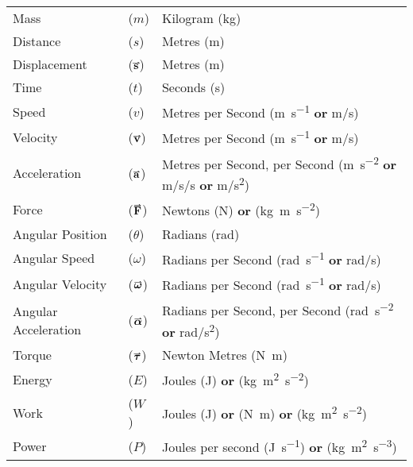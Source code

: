 \documentclass[main.tex]{subfiles}
\begin{document}
            \begin{table}[!h]
                \noindent\begin{tabular}{@{} p{40mm} C{10mm} p{110mm}}
                    Mass &($m$) &Kilogram (\si{\kilo\gram})\\[\tablegap]
                    Distance &($s$) &Metres (\si{\metre})\\[\tablegap]
                    Displacement &($\vect{s}$) &Metres (\si{\metre})\\[\tablegap]
                    Time &($t$) &Seconds (\si{\second})\\[\tablegap]
                    Speed &($v$) &Metres per Second (\si{\metre \per\second} \textbf{or} \si{\metre / \second})\\[\tablegap]
                    Velocity &($\vect{v}$) &Metres per Second (\si{\metre \per\second} \textbf{or} \si{\metre / \second})\\[\tablegap]
                    Acceleration &($\vect{a}$) &Metres per Second, per Second (\si{\metre \per\second\squared} \textbf{or} \si{\metre /\second /\second} \textbf{or} \si{\metre / \second\squared})\\[\tablegap]
                    Force &($\vect{F}$) &Newtons (\si{\newton}) \textbf{or} (\si{\kilo\gram \metre \per\second\squared})\\[\tablegap]
                    Angular Position &($\theta$) &Radians (\si{\radian})\\[\tablegap]
                    Angular Speed &($\omega$) &Radians per Second (\si{\radian \per\second} \textbf{or} \si{\radian /\second})\\[\tablegap]
                    Angular Velocity &($\vect{\omega}$) &Radians per Second (\si{\radian \per\second} \textbf{or} \si{\radian /\second})\\[\tablegap]
                    Angular Acceleration &($\vect{\alpha}$) &Radians per Second, per Second (\si{\radian \per\second\squared} \textbf{or} \si{\radian / \second\squared})\\[\tablegap]
                    Torque &($\vect{\tau}$) &Newton Metres (\si{\newton \metre})\\[\tablegap]
                    Energy &($E$) &Joules (\si{\joule}) \textbf{or} (\si{\kilo\gram \metre\squared \per\second\squared})\\[\tablegap]
                    Work &($W$) &Joules (\si{\joule}) \textbf{or} (\si{\newton \metre}) \textbf{or} (\si{\kilo\gram \metre\squared \per\second\squared})\\[\tablegap]
                    Power &($P$) &Joules per second (\si{\joule \per\second}) \textbf{or} (\si{\kilo\gram \metre\squared \per\second\cubed})
                \end{tabular}
            \end{table}
            
\end{document}
